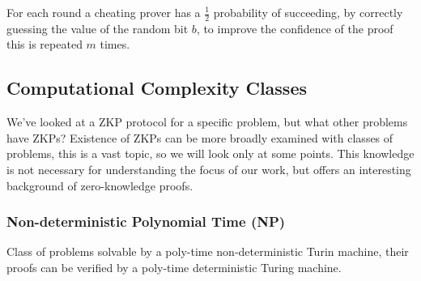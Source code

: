 \noindent For each round a cheating prover has a $\frac{1}{2}$ probability of succeeding, by correctly guessing the value of the random bit $b$, to improve the confidence of the proof this is repeated $m$ times.

%

\subsection{Computational Complexity Classes}
We've looked at a ZKP protocol for a specific problem, but what other problems have ZKPs?
Existence of ZKPs can be more broadly examined with classes of problems, this is a vast topic, so we will look only at some points. 
This knowledge is not necessary for understanding the focus of our work, but offers an interesting background of zero-knowledge proofs.

\subsubsection{Non-deterministic Polynomial Time (NP)}


Class of problems solvable by a poly-time non-deterministic Turin machine, their proofs can be verified by a poly-time deterministic Turing machine.

